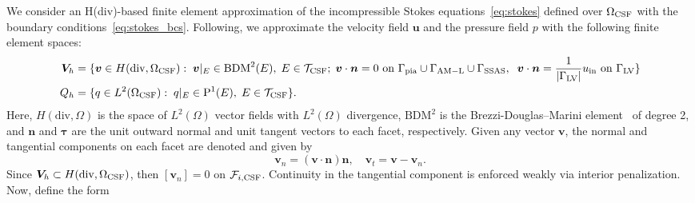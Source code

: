 We consider an H(div)-based finite element approximation of the incompressible Stokes equations~\eqref{eq:stokes} defined over $\Omega_{\rm CSF}$ with the boundary conditions~\eqref{eq:stokes_bcs}. Following\cite{hong2016robust}, we approximate the velocity field $\bm u$ and the pressure field $p$ with the following finite element spaces:
\begin{align*}
  \bm V_h &= \{ \bm v  \in H(\mathrm{div}, \Omega_{\mathrm{CSF}}): \;
  \bm v \vert_{E} \in \mathrm{BDM}^2(E), \; E \in \mathcal{T}_{\rm CSF}; \;
  \bm v \cdot \bm n = 0
  \text{ on } \Gamma_{\rm{pia}} \cup \Gamma_{\rm AM-L} \cup \Gamma_{\rm{SSAS}}, \;\; \bm v \cdot \bm n = \frac{1}{|\Gamma_{\mathrm{LV}}|} u_{\mathrm{in}} \text{ on } \Gamma_{\mathrm{LV}} \}  \\ 
  Q_h  &= \{q \in L^2(\Omega_{\rm CSF}): \; q \vert_E \in \mathrm{P}^1(E),
  \; E \in \mathcal{T}_{\rm CSF} \}. 
\end{align*}
 Here, $H(\mathrm{div}, \Omega)$ is the space of $L^2(\Omega)$ vector fields with $L^2(\Omega)$ divergence, $\mathrm{BDM}^2$ is the Brezzi-Douglas--Marini element~\cite{brezzi1987mixed} of degree 2, and $\bm n$ and $\bm \tau$ are the unit outward normal and unit tangent vectors to each facet, respectively. Given any vector $\bm v$, the normal and tangential components on each facet are denoted and given by 
\begin{equation}
\bm v_n = (\bm v \cdot \bm n) \bm n, \quad \bm v_t = \bm v - \bm v_n. 
\end{equation}
Since $\bm V_h \subset H(\mathrm{div}, \Omega_{\rm CSF})$, then $[\bm
  v_n] = 0 $ on $\mathcal{F}_{i, \rm CSF}$. Continuity in the
tangential component is enforced weakly via interior penalization.  Now, define the form 
